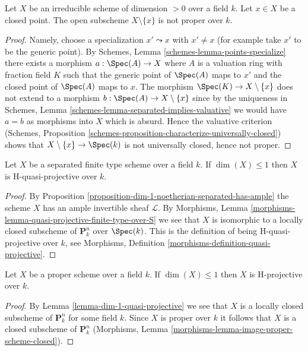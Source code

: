 \begin{lemma}
\label{lemma-proper-minus-point}
Let $X$ be an irreducible scheme of dimension $> 0$ over a field $k$.
Let $x \in X$ be a closed point. The open subscheme $X \setminus \{x\}$
is not proper over $k$.
\end{lemma}

\begin{proof}
Namely, choose a specialization $x' \leadsto x$ with $x' \not = x$
(for example take $x'$ to be the generic point). By
Schemes, Lemma \ref{schemes-lemma-points-specialize}
there exists a morphism $a : \Spec(A) \to X$
where $A$ is a valuation ring with fraction field $K$
such that the generic point of $\Spec(A)$
maps to $x'$ and the closed point of $\Spec(A)$ maps to $x$.
The morphism $\Spec(K) \to X \setminus \{x\}$ does
not extend to a morphism $b : \Spec(A) \to X \setminus \{x\}$
since by the uniqueness in Schemes, Lemma
\ref{schemes-lemma-separated-implies-valuative}
we would have $a = b$ as morphisms into $X$ which is absurd.
Hence the valuative criterion
(Schemes, Proposition
\ref{schemes-proposition-characterize-universally-closed})
shows that $X \setminus \{x\} \to \Spec(k)$
is not universally closed, hence not proper.
\end{proof}

\begin{lemma}
\label{lemma-dim-1-quasi-projective}
Let $X$ be a separated finite type scheme over a field $k$.
If $\dim(X) \leq 1$ then $X$ is H-quasi-projective over $k$.
\end{lemma}

\begin{proof}
By Proposition \ref{proposition-dim-1-noetherian-separated-has-ample}
the scheme $X$ has an ample invertible sheaf $\mathcal{L}$.
By Morphisms, Lemma \ref{morphisms-lemma-quasi-projective-finite-type-over-S}
we see that $X$ is isomorphic to a locally
closed subscheme of $\mathbf{P}^n_k$ over $\Spec(k)$. This is
the definition of being H-quasi-projective over $k$, see
Morphisms, Definition \ref{morphisms-definition-quasi-projective}.
\end{proof}

\begin{lemma}
\label{lemma-dim-1-proper-projective}
Let $X$ be a proper scheme over a field $k$.
If $\dim(X) \leq 1$ then $X$ is H-projective over $k$.
\end{lemma}

\begin{proof}
By Lemma \ref{lemma-dim-1-quasi-projective} we see that $X$ is a
locally closed subscheme of $\mathbf{P}^n_k$ for some field $k$.
Since $X$ is proper over $k$ it follows that $X$ is a closed subscheme
of $\mathbf{P}^n_k$
(Morphisms, Lemma \ref{morphisms-lemma-image-proper-scheme-closed}).
\end{proof}

